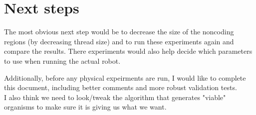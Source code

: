 \documentclass[a4paper]{article}
\begin{document}
\section{Next steps}
\label{sec-3}
The most obvious next step would be to decrease the size of the noncoding regions
 (by decreasing thread size) and to run these experiments again and compare the results. 
There experiments would also help decide which parameters to use when running the actual robot.\\
\vspace

Additionally, before any physical expeirments are run, I would like to complete this document, 
including better comments and more robust validation tests.\\

\vspace
I also think we need to look/tweak the algorithm that generates "viable" organisms to make sure
it is giving us what we want.
\end{document}
